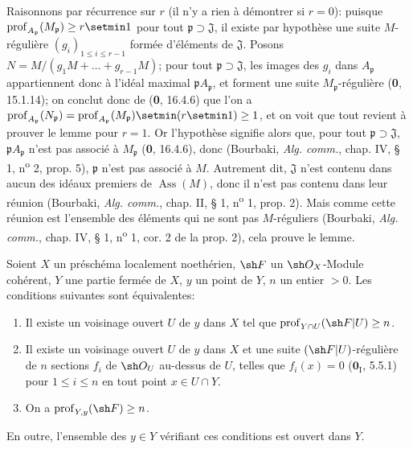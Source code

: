 Raisonnons par récurrence sur $r$ (il n'y a rien à démontrer si $r=0$): puisque $\operatorname{prof}_{A_{\mathfrak p}}(M_{\mathfrak p})\geq r\setmin 1$ pour tout $\mathfrak p\supset\mathfrak J$, il existe par hypothèse une suite $M$-régulière $(g_i)_{1\leq i\leq r-1}$ formée d'éléments de $\mathfrak J$. Posons $N=M/(g_1M+\ldots+g_{r-1}M)$; pour tout $\mathfrak p\supset\mathfrak J$, les images des $g_i$ dans $A_{\mathfrak p}$ appartiennent donc à l'idéal maximal $\mathfrak pA_{\mathfrak p}$, et forment une suite $M_{\mathfrak p}$-régulière (\textbf{0}, 15.1.14); on conclut donc de (\textbf{0}, 16.4.6) que l'on a $\operatorname{prof}_{A_{\mathfrak p}}(N_{\mathfrak p})=\operatorname{prof}_{A_{\mathfrak p}}(M_{\mathfrak p})\setmin(r\setmin 1)\geq1$, et on voit que tout revient à prouver le lemme pour $r=1$. Or l'hypothèse signifie alors que, pour tout $\mathfrak p\supset\mathfrak J$, $\mathfrak pA_{\mathfrak p}$ n'est pas associé à $M_{\mathfrak p}$ (\textbf{0}, 16.4.6), donc (Bourbaki, \emph{Alg. comm.}, chap. IV, § 1, n\textsuperscript{o} 2, prop. 5), $\mathfrak p$ n'est pas associé à $M$. Autrement dit, $\mathfrak J$ n'est contenu dans aucun des idéaux premiers de $\operatorname{Ass}(M)$, donc il n'est pas contenu dans leur réunion (Bourbaki, \emph{Alg. comm.}, chap. II, § 1, n\textsuperscript{o} 1, prop. 2). Mais comme cette réunion est l'ensemble des éléments qui ne sont pas $M$-réguliers (Bourbaki, \emph{Alg. comm.}, chap. IV, § 1, n\textsuperscript{o} 1, cor. 2 de la prop. 2), cela prouve le lemme.

\begin{proposition}[19.9.3]
\label{IV.19.9.3}
Soient $X$ un préschéma localement noethérien, $\sh F$ un $\sh O_X$-Module cohérent, $Y$ une partie fermée de $X$, $y$ un point de $Y$, $n$ un entier $>0$. Les conditions suivantes sont équivalentes:
\begin{enumerate}
  \item[\textup{a)}] Il existe un voisinage ouvert $U$ de $y$ dans $X$ tel que $\operatorname{prof}_{Y\cap U}(\sh F|U)\geq n$.
  \item[\textup{b)}] Il existe un voisinage ouvert $U$ de $y$ dans $X$ et une suite $(\sh F|U)$-régulière de $n$ sections $f_i$ de $\sh O_U$ au-dessus de $U$, telles que $f_i(x)=0$ \textup{($\mathbf{0}_{\mathrm I}$, 5.5.1)} pour $1\leq i\leq n$ en tout point $x\in U\cap Y$.
  \item[\textup{c)}] On a $\operatorname{prof}_{Y,y}(\sh F)\geq n$.
\end{enumerate}

En outre, l'ensemble des $y\in Y$ vérifiant ces conditions est ouvert dans $Y$.
\end{proposition}

